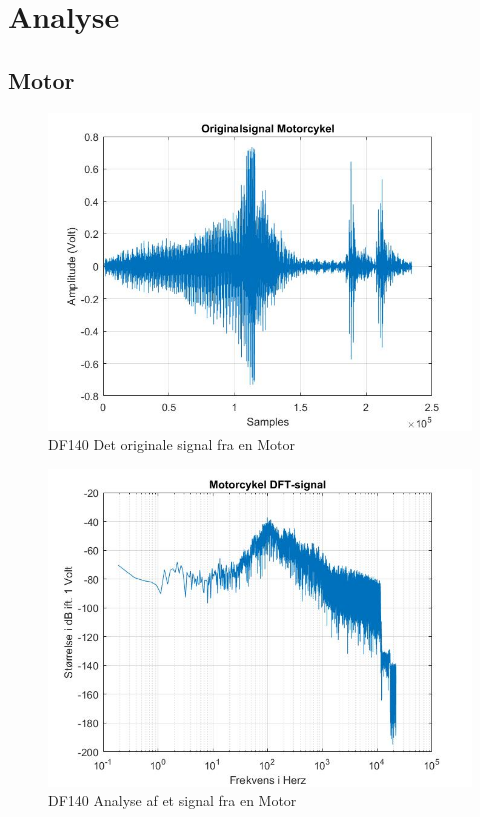 \chapter{Analyse}\label{ch:analyse}



\section{Motor}

\begin{figure}[H]
	\centering
	\includegraphics[width=140mm]{figures/Motor/original.jpg}
	\caption{DF140 Det originale signal fra en Motor}
	\label{fig:Motor original}
\end{figure}

\begin{figure}[H]
	\centering
	\includegraphics[width=140mm]{figures/Motor/DFT.jpg}
	\caption{DF140 Analyse af et signal fra en Motor}
	\label{fig:Motor DF140}
\end{figure}

